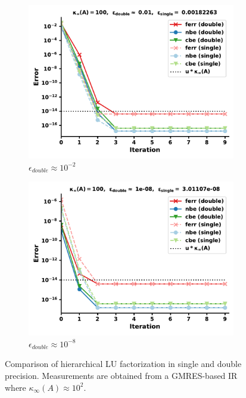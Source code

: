 \begin{figure}[h]
\centering
\begin{subfigure}{.5\textwidth}
  \centering
  \includegraphics[width=\linewidth]{chapters/5_experiments/figures/GMRES512_e0_0s.pdf}
  \caption{$\epsilon_{double} \approx 10^{-2}$}
  \label{fig:lrirsg1_1}
\end{subfigure}%
\begin{subfigure}{.5\textwidth}
  \centering
  \includegraphics[width=\linewidth]{chapters/5_experiments/figures/GMRES512_e0_1s.pdf}
  \caption{$\epsilon_{double} \approx 10^{-8}$}
  \label{fig:lrirsg1_2}
\end{subfigure}
\caption[Mixed Precision Low-Rank GMRES-IR 1]{Comparison of hierarchical LU factorization in single and double precision. Measurements are obtained from a GMRES-based IR where $\kappa_\infty(A) \approx 10^2$.}
\label{fig:lrirsg1}
\end{figure}


